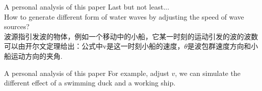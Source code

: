 \documentclass{beamer}
\begin{document}
\begin{frame}{A personal analysis of this paper}
  Last but not least...
  \\How to generate different form of water waves by adjusting the speed of wave sources?
  \\波源指引发波的物体，例如一个移动中的小船，它某一时刻的运动引发的波的波数可以由开尔文定理给出：公式中v是这一时刻小船的速度，$\theta$是波包群速度方向和小船运动方向的夹角.

  \begin{figure}[thpb]
    \centering
  \label{fig:system}
  \end{figure}
\end{frame}
\begin{frame}{A personal analysis of this paper}
  For example, adjust $v$, we can simulate the different effect of a swimming duck and a working ship.

  \begin{figure}[thpb]
    \centering
  \label{fig:system}
  \end{figure}
 \end{frame}
\end{document}
